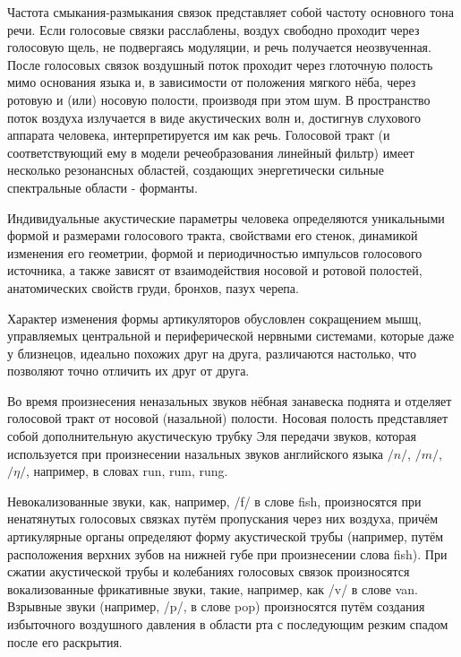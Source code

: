 Частота смыкания-размыкания связок представляет собой частоту основного тона
речи. Если голосовые связки расслаблены, воздух свободно проходит через
голосовую щель, не подвергаясь модуляции, и речь получается неозвученная. После
голосовых связок воздушный поток проходит через глоточную полость мимо
основания языка и, в зависимости от положения мягкого нёба, через ротовую и
(или) носовую полости, производя при этом шум.  В пространство поток воздуха
излучается в виде акустических волн и, достигнув слухового аппарата человека,
интерпретируется им как речь. Голосовой тракт (и соответствующий ему в модели
речеобразования линейный фильтр) имеет несколько резонансных областей,
создающих энергетически сильные спектральные области - форманты.

Индивидуальные акустические параметры человека определяются уникальными формой
и размерами голосового тракта, свойствами его стенок, динамикой изменения его
геометрии, формой и периодичностью импульсов голосового источника, а также
зависят от взаимодействия носовой и ротовой полостей, анатомических свойств
груди, бронхов, пазух черепа.

Характер изменения формы артикуляторов обусловлен сокращением мышц, управляемых
центральной и периферической нервными системами, которые даже у близнецов,
идеально похожих друг на друга, различаются настолько, что позволяют точно
отличить их друг от друга.

Во время произнесения неназальных звуков нёбная занавеска поднята и отделяет
голосовой тракт от носовой (назальной) полости. Носовая полость представляет
собой дополнительную акустическую трубку Эля передачи звуков, которая
используется при произнесении назальных звуков английского языка $\slash n
\slash$, $\slash m \slash$, $\slash \eta \slash$, например, в словах run, rum,
rung.

Невокализованные звуки, как, например, /f/ в слове fish, произносятся при
ненатянутых голосовых связках путём пропускания через них воздуха, причём
артикулярные органы определяют форму акустической трубы (например, путём
расположения верхних зубов на нижней губе при произнесении слова fish). При
сжатии акустической трубы и колебаниях голосовых связок произносятся
вокализованные фрикативные звуки, такие, например, как /v/ в слове van.
Взрывные звуки (например, /p/, в слове pop) произносятся путём создания
избыточного воздушного давления в области рта с последующим резким спадом после
его раскрытия.


